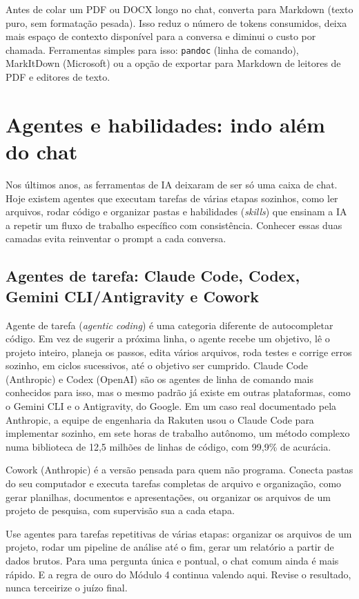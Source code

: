 \documentclass[11pt,a4paper]{article}
\begin{document}
\begin{dica}
Antes de colar um PDF ou DOCX longo no chat, converta para Markdown (texto puro, sem formatação pesada). Isso reduz o número de tokens consumidos, deixa mais espaço de contexto disponível para a conversa e diminui o custo por chamada. Ferramentas simples para isso: \texttt{pandoc} (linha de comando), MarkItDown (Microsoft) ou a opção de exportar para Markdown de leitores de PDF e editores de texto.
\end{dica}

\clearpage
\section{Agentes e habilidades: indo além do chat}
\small
Nos últimos anos, as ferramentas de IA deixaram de ser só uma caixa de chat. Hoje existem agentes que executam tarefas de várias etapas sozinhos, como ler arquivos, rodar código e organizar pastas e habilidades (\textit{skills}) que ensinam a IA a repetir um fluxo de trabalho específico com consistência. Conhecer essas duas camadas evita reinventar o prompt a cada conversa.

\subsection*{Agentes de tarefa: Claude Code, Codex, Gemini CLI/Antigravity e Cowork}
Agente de tarefa (\textit{agentic coding}) é uma categoria diferente de autocompletar código. Em vez de sugerir a próxima linha, o agente recebe um objetivo, lê o projeto inteiro, planeja os passos, edita vários arquivos, roda testes e corrige erros sozinho, em ciclos sucessivos, até o objetivo ser cumprido. Claude Code (Anthropic) e Codex (OpenAI) são os agentes de linha de comando mais conhecidos para isso, mas o mesmo padrão já existe em outras plataformas, como o Gemini CLI e o Antigravity, do Google. Em um caso real documentado pela Anthropic, a equipe de engenharia da Rakuten usou o Claude Code para implementar sozinho, em sete horas de trabalho autônomo, um método complexo numa biblioteca de 12,5 milhões de linhas de código, com 99,9\% de acurácia.

Cowork (Anthropic) é a versão pensada para quem não programa. Conecta pastas do seu computador e executa tarefas completas de arquivo e organização, como gerar planilhas, documentos e apresentações, ou organizar os arquivos de um projeto de pesquisa, com supervisão sua a cada etapa.
\begin{dica}
Use agentes para tarefas repetitivas de várias etapas: organizar os arquivos de um projeto, rodar um pipeline de análise até o fim, gerar um relatório a partir de dados brutos. Para uma pergunta única e pontual, o chat comum ainda é mais rápido. E a regra de ouro do Módulo 4 continua valendo aqui. Revise o resultado, nunca terceirize o juízo final.
\end{dica}
\end{document}
